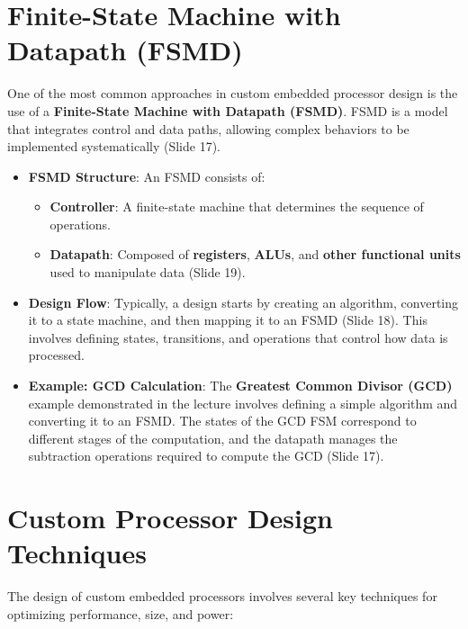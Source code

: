 \documentclass[
  14pt,
  a4paper,
  numbers=noendperiod,
  headinclude=true,
  footinclude=true,
  DIV=calc]{scrreprt}
\begin{document}
\section{Finite-State Machine with Datapath
(FSMD)}\label{finite-state-machine-with-datapath-fsmd}

One of the most common approaches in custom embedded processor design is
the use of a \textbf{Finite-State Machine with Datapath (FSMD)}. FSMD is
a model that integrates control and data paths, allowing complex
behaviors to be implemented systematically (Slide 17).

\begin{itemize}
\item
  \textbf{FSMD Structure}: An FSMD consists of:

  \begin{itemize}
  \item
    \textbf{Controller}: A finite-state machine that determines the
    sequence of operations.
  \item
    \textbf{Datapath}: Composed of \textbf{registers}, \textbf{ALUs},
    and \textbf{other functional units} used to manipulate data (Slide
    19).
  \end{itemize}
\item
  \textbf{Design Flow}: Typically, a design starts by creating an
  algorithm, converting it to a state machine, and then mapping it to an
  FSMD (Slide 18). This involves defining states, transitions, and
  operations that control how data is processed.
\item
  \textbf{Example: GCD Calculation}: The \textbf{Greatest Common Divisor
  (GCD)} example demonstrated in the lecture involves defining a simple
  algorithm and converting it to an FSMD. The states of the GCD FSM
  correspond to different stages of the computation, and the datapath
  manages the subtraction operations required to compute the GCD (Slide
  17).
\end{itemize}

\section{Custom Processor Design
Techniques}\label{custom-processor-design-techniques}

The design of custom embedded processors involves several key techniques
for optimizing performance, size, and power:
\end{document}
